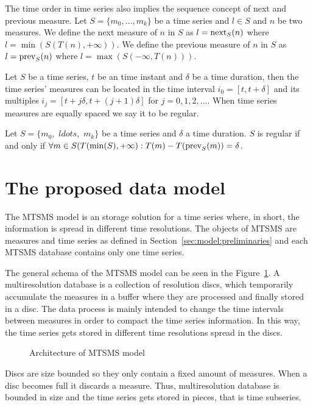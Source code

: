 The time order in time series also implies the sequence concept of
next and previous measure.  Let $S=\{m_0, \ldots, m_k\}$ be a time
series and $l\in S$ and $n$ be two measures. We define the next
measure of $n$ in $S$ as $l=\operatorname*{next}_S(n)$ where $l =
\min(S(T(n),+\infty))$. We define the previous measure of $n$ in $S$
as $l=\operatorname*{prev}_S(n)$ where $l = \max(S(-\infty,T(n)))$.

Let $S$ be a time series, $t$ be an time instant and $\delta$ be a
time duration, then the time series' measures can be located in the
time interval $i_0=[t, t+\delta]$ and its multiples $i_j=[t+j\delta,
t+(j+1)\delta]$ for $j=0,1,2,\ldots$. When time series measures are
equally spaced we say it to be regular.
\begin{definition}
  Let $S=\{m_0,$ $ldots,$ $m_k\}$ be a time series and $\delta$ a time
  duration. $S$ is regular if and only if $\forall m \in
  S(T(\min(S),+\infty):T(m) - T(\operatorname*{prev}_S(m)) = \delta$.
\end{definition}

\section{The proposed data model}
\label{sec:MTSMS}

The MTSMS model is an storage solution for a time series where, in
short, the information is spread in different time resolutions.  The
objects of MTSMS are measures and time series as defined in
Section~\ref{sec:model:preliminaries} and each MTSMS database contains
only one time series.

The general schema of the MTSMS model can be seen in the
Figure~\ref{fig:model:mtsdb}.  A multiresolution database is a
collection of resolution discs, which temporarily accumulate the
measures in a buffer where they are processed and finally stored in a
disc. The data process is mainly intended to change the time intervals
between measures in order to compact the time series information. In
this way, the time series gets stored in different time resolutions
spread in the discs.

\begin{figure}[tp]
  \centering
  
  \smallskip
  \caption{Architecture of MTSMS model}
  \label{fig:model:mtsdb}
\end{figure}

Discs are size bounded so they only contain a fixed amount of
measures. When a disc becomes full it discards a measure. Thus,
multiresolution database is bounded in size and the time series gets
stored in pieces, that is time subseries.

